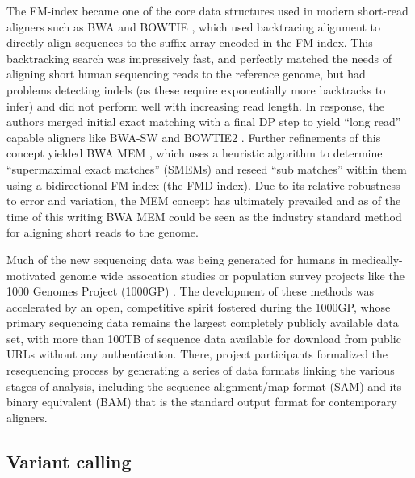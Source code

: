 The FM-index became one of the core data structures used in modern short-read aligners such as BWA \cite{li2009fast} and BOWTIE \cite{langmead2009ultrafast}, which used backtracing alignment to directly align sequences to the suffix array encoded in the FM-index.
This backtracking search was impressively fast, and perfectly matched the needs of aligning short human sequencing reads to the reference genome, but had problems detecting indels (as these require exponentially more backtracks to infer) and did not perform well with increasing read length.
In response, the authors merged initial exact matching with a final DP step to yield ``long read'' capable aligners like BWA-SW \cite{li2010fast} and BOWTIE2 \cite{langmead2012fast}.
Further refinements of this concept yielded BWA MEM \cite{li2013aligning}, which uses a heuristic algorithm to determine ``supermaximal exact matches'' (SMEMs) and reseed ``sub matches'' within them using a bidirectional FM-index (the FMD index).
Due to its relative robustness to error and variation, the MEM concept has ultimately prevailed and as of the time of this writing BWA MEM could be seen as the industry standard method for aligning short reads to the genome.

Much of the new sequencing data was being generated for humans in medically-motivated genome wide assocation studies \cite{uk10k2015uk10k} or population survey projects like the 1000 Genomes Project (1000GP) \cite{1000Gphase1,1000g2015}.
The development of these methods was accelerated by an open, competitive spirit fostered during the 1000GP, whose primary sequencing data remains the largest completely publicly available data set, with more than 100TB of sequence data available for download from public URLs without any authentication.
There, project participants formalized the resequencing process by generating a series of data formats linking the various stages of analysis, including the sequence alignment/map format (SAM) and its binary equivalent (BAM) \cite{li2009sequence} that is the standard output format for contemporary aligners.


\subsection{Variant calling}

